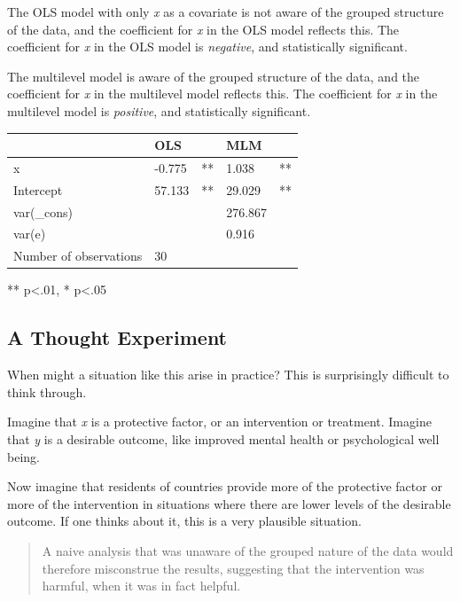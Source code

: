 \documentclass[
  letterpaper,
  DIV=11,
  numbers=noendperiod]{scrreprt}
\begin{document}
The OLS model with only \emph{x} as a covariate is not aware of the
grouped structure of the data, and the coefficient for \emph{x} in the
OLS model reflects this. The coefficient for \emph{x} in the OLS model
is \emph{negative}, and statistically significant.

The multilevel model is aware of the grouped structure of the data, and
the coefficient for \emph{x} in the multilevel model reflects this. The
coefficient for \emph{x} in the multilevel model is \emph{positive}, and
statistically significant.

\begin{longtable}[]{@{}lllll@{}}
\toprule\noalign{}
& OLS & & MLM & \\
\midrule\noalign{}
\endhead
\bottomrule\noalign{}
\endlastfoot
x & -0.775 & ** & 1.038 & ** \\
Intercept & 57.133 & ** & 29.029 & ** \\
var(\_cons) & & & 276.867 & \\
var(e) & & & 0.916 & \\
Number of observations & 30 & & & \\
\end{longtable}

** p\textless.01, * p\textless.05

\subsection{A Thought Experiment}\label{a-thought-experiment}

When might a situation like this arise in practice? This is surprisingly
difficult to think through.

Imagine that \emph{x} is a protective factor, or an intervention or
treatment. Imagine that \emph{y} is a desirable outcome, like improved
mental health or psychological well being.

Now imagine that residents of countries provide more of the protective
factor or more of the intervention in situations where there are lower
levels of the desirable outcome. If one thinks about it, this is a very
plausible situation.

\begin{quote}
A naive analysis that was unaware of the grouped nature of the data
would therefore misconstrue the results, suggesting that the
intervention was harmful, when it was in fact helpful.
\end{quote}
\end{document}

